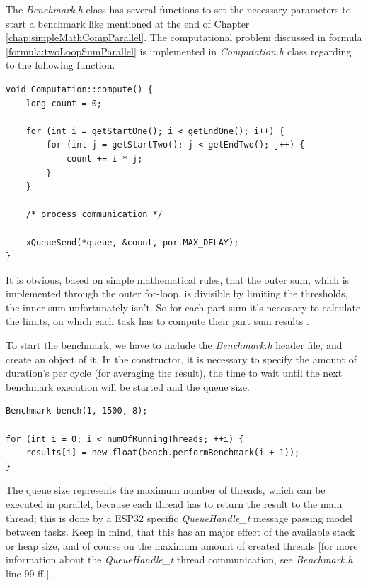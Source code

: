 The \textit{Benchmark.h} class has several functions to set the necessary parameters to start a benchmark like mentioned at the end of Chapter \ref{chap:simpleMathCompParallel}. The computational problem discussed in formula \ref{formula:twoLoopSumParallel} is implemented in \textit{Computation.h} class regarding to the following function.

\begin{lstlisting}
void Computation::compute() {
	long count = 0;

	for (int i = getStartOne(); i < getEndOne(); i++) {
		for (int j = getStartTwo(); j < getEndTwo(); j++) {
			count += i * j;
		}
	}

	/* process communication */
	
	xQueueSend(*queue, &count, portMAX_DELAY);
}
\end{lstlisting}

It is obvious, based on simple mathematical rules, that the outer sum, which is implemented through the outer for-loop, is divisible by limiting the thresholds, the inner sum unfortunately isn't. So for each part sum it's necessary to calculate the limits, on which each task has to compute their part sum results \parencite[see][Benchmark.h, line 94 ff.]{internet12}.

\newpage

\noindent To start the benchmark, we have to include the \textit{Benchmark.h} header file, and create an object of it. In the constructor, it is necessary to specify the amount of duration's per cycle (for averaging the result), the time to wait until the next benchmark execution will be started and the queue size.

\begin{lstlisting}
Benchmark bench(1, 1500, 8);

for (int i = 0; i < numOfRunningThreads; ++i) {
	results[i] = new float(bench.performBenchmark(i + 1));
}
\end{lstlisting}

The queue size represents the maximum number of threads, which can be executed in parallel, because each thread has to return the result to the main thread; this is done by a ESP32 specific \textit{QueueHandle\_t} message passing model between tasks. Keep in mind, that this has an major effect of the available stack or heap size, and of course on the maximum amount of created threads [for more information about the \textit{QueueHandle\_t} thread communication, see \textit{Benchmark.h} line 99 ff.].\\

